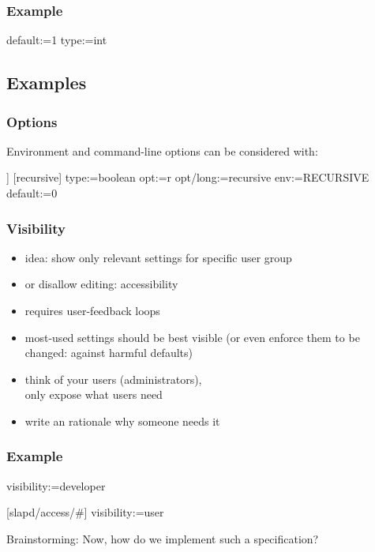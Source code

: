 \begin{frame}[fragile]
	\frametitle{Example}
	\begin{code}
	default:=1
	type:=int
	\end{code}
\end{frame}

\subsection{Examples}

\begin{frame}[fragile]
	\frametitle{Options}

	Environment and command-line options can be considered with:

	\begin{code}[morekeywords={long},gobble=4]]
	[recursive]
	  type:=boolean
	  opt:=r
	  opt/long:=recursive
	  env:=RECURSIVE
	  default:=0
	\end{code}
\end{frame}

\begin{frame}
	\frametitle{Visibility}
	\begin{itemize}
	\item idea: show only relevant settings for specific user group
	\item or disallow editing: accessibility
	\pause
	\item requires user-feedback loops~\cite{xu2015hey}
	\item most-used settings should be best visible (or even enforce them to be changed: against harmful defaults)
	\item think of your users (administrators), \\ only expose what users need
	\item write an rationale why someone needs it
	\end{itemize}
\end{frame}

\begin{frame}[fragile]
	\frametitle{Example}
	\begin{code}
	visibility:=developer

	[slapd/access/#]
	visibility:=user
	\end{code}
\end{frame}


\begin{assignment}
	\begin{task}
	Brainstorming: Now, how do we implement such a specification?
	\end{task}
\end{assignment}

